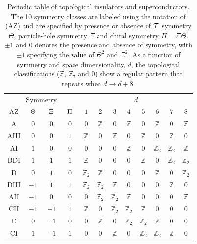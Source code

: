 \documentclass[twocolumn,floatfix,showpacs,rmp,aps]{revtex4}
\begin{document}
	\begin{table}
		\centering
		\begin{ruledtabular}
			\begin{tabular}{c|ccc|cccccccc}
				\multicolumn{4}{c|}{Symmetry } & \multicolumn{8}{c}{ $d$} \\
				\multicolumn{1}{c}{AZ} &$\hspace{1.5mm}\Theta\hspace{1.5mm} $ &
				$\hspace{1.5mm} \Xi\hspace{1.5mm} $ &
				$\hspace{1.5mm} \Pi\hspace{1.5mm} $ &
				$1$   &  $2$ &  $3$ &  $4$ &  $5$ & $6$ & $7$& $8$ \\
				\hline
				A & $0$ & $0$ & $0$  &$0$& $\mathbb{Z}$ &$0$& $\mathbb{Z}$ &$0$& $\mathbb{Z}$ &$0$& $\mathbb{Z}$\\
				AIII & $0$ & $0$ & $1$ & $\mathbb{Z}$ &$0$& $\mathbb{Z}$ &$0$& $\mathbb{Z}$ &$0$& $\mathbb{Z}$& $0$\\
				\hline
				AI & $1$ & $0$ & $0$  &$0$&$0$&$0$&$\mathbb{Z}$&$0$&$\mathbb{Z}_2$&$\mathbb{Z}_2$& $\mathbb{Z}$ \\
				BDI & $1$ &$1$ &$1$ & $\mathbb{Z}$ &$0$&$0$&$0$&$\mathbb{Z}$&$0$&$\mathbb{Z}_2$& $\mathbb{Z}_2$\\
				D & $0$ &$1$ &$0$ & $\mathbb{Z}_2$& $\mathbb{Z}$ &$0$&$0$&$0$&$\mathbb{Z}$&$0$&$\mathbb{Z}_2$\\
				DIII&$-1$ &$1$ &$1$ &$\mathbb{Z}_2$& $\mathbb{Z}_2$& $\mathbb{Z}$ &$0$&$0$&$0$&$\mathbb{Z}$&$0$\\
				AII & $-1$ & $0$ & $0$ &$0$&$\mathbb{Z}_2$& $\mathbb{Z}_2$& $\mathbb{Z}$ &$0$&$0$& $0$&$\mathbb{Z}$\\
				CII & $-1$ &$-1$ & $1$&$\mathbb{Z}$ & $0$&$\mathbb{Z}_2$& $\mathbb{Z}_2$& $\mathbb{Z}$ &$0$&$0$&$0$ \\
				C & $0$ & $-1$& $0$ & $0$ &$\mathbb{Z}$ &$0$&$\mathbb{Z}_2$& $\mathbb{Z}_2$& $\mathbb{Z}$ &$0$& $0$\\
				CI & $1$ & $-1$ & $1$& $0$ & $0$&$\mathbb{Z}$&$0$&$\mathbb{Z}_2$& $\mathbb{Z}_2$& $\mathbb{Z}$& $0$ \\
				
			\end{tabular}
		\end{ruledtabular}
		\caption{Periodic table of topological insulators and superconductors.  The 10 symmetry
			classes are labeled using the notation of \textcite{altland97} (AZ) and are
			specified by presence or absence of ${\cal T}$ symmetry
			$\Theta$, particle-hole symmetry $\Xi$ and chiral symmetry $\Pi = \Xi\Theta$.
			$\pm 1$ and $0$ denotes the presence and absence of symmetry,
			with $\pm 1$ specifying the value of $\Theta^2$ and
			$\Xi^2$.  As a function of symmetry and space dimensionality, $d$, the topological
			classifications ($\mathbb{Z}$, $\mathbb{Z}_2$ and $0$) show a regular pattern
			that repeats when $d \rightarrow d+8$.  }
		\label{tab:periodic}
	\end{table}
	
\end{document}
